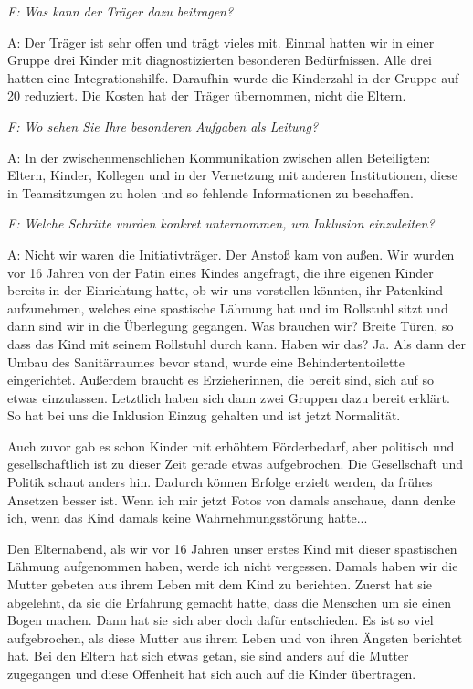 \begin{linenumbers*}
\emph{F: Was kann der Träger dazu beitragen?} 

A: Der Träger ist sehr offen und trägt vieles mit. Einmal hatten wir in einer Gruppe drei Kinder mit diagnostizierten besonderen Bedürfnissen. Alle drei hatten eine Integrationshilfe. Daraufhin wurde die Kinderzahl in der Gruppe auf 20 reduziert. Die Kosten hat der Träger übernommen, nicht die Eltern.  

\emph{F: Wo sehen Sie Ihre besonderen Aufgaben als Leitung?} 

A: In der zwischenmenschlichen Kommunikation zwischen allen Beteiligten: Eltern, Kinder, Kollegen und in der Vernetzung mit anderen Institutionen, diese in Teamsitzungen zu holen und so fehlende Informationen zu beschaffen.  

\emph{F: Welche Schritte wurden konkret unternommen, um Inklusion einzuleiten?}

A: Nicht wir waren die Initiativträger. Der Anstoß kam von außen. Wir wurden vor 16 Jahren von der Patin eines Kindes angefragt, die ihre eigenen Kinder bereits in der Einrichtung hatte, ob wir uns vorstellen könnten, ihr Patenkind aufzunehmen, welches eine spastische Lähmung hat und im Rollstuhl sitzt und dann sind wir in die Überlegung gegangen. Was brauchen wir? Breite Türen, so dass das Kind mit seinem Rollstuhl durch kann. Haben wir das? Ja. Als dann der Umbau des Sanitärraumes bevor stand, wurde eine Behindertentoilette eingerichtet. 
Außerdem braucht es Erzieherinnen, die bereit sind, sich auf so etwas einzulassen. Letztlich haben sich dann zwei Gruppen dazu bereit erklärt. So hat bei uns die Inklusion Einzug gehalten und ist jetzt Normalität.  

Auch zuvor gab es schon Kinder mit erhöhtem Förderbedarf, aber politisch und gesellschaftlich ist zu dieser Zeit gerade etwas aufgebrochen. Die Gesellschaft und Politik schaut anders hin. Dadurch können Erfolge erzielt werden, da frühes Ansetzen besser ist. Wenn ich mir jetzt Fotos von damals anschaue, dann denke ich, wenn das Kind damals keine Wahrnehmungsstörung hatte...  

Den Elternabend, als wir vor 16 Jahren unser erstes Kind mit dieser spastischen Lähmung aufgenommen haben, werde ich nicht vergessen. Damals haben wir die Mutter gebeten aus ihrem Leben mit dem Kind zu berichten. Zuerst hat sie abgelehnt, da sie die Erfahrung gemacht hatte, dass die Menschen um sie einen Bogen machen. Dann hat sie sich aber doch dafür entschieden. Es ist so viel aufgebrochen, als diese Mutter aus ihrem Leben und von ihren Ängsten berichtet hat. Bei den Eltern hat sich etwas getan, sie sind anders auf die Mutter zugegangen und diese Offenheit hat sich auch auf die Kinder übertragen.  


\end{linenumbers*}
